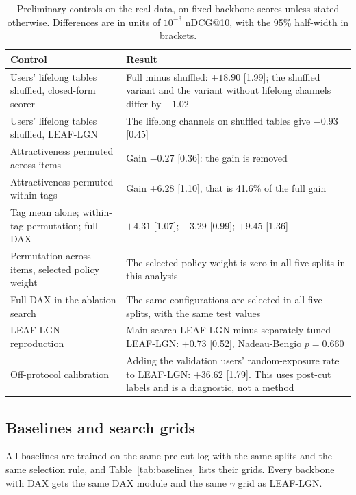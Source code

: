 \begin{table}[tbp]
\centering
\caption{Preliminary controls on the real data, on fixed backbone scores unless stated otherwise. Differences are in units of $10^{-3}$ nDCG@10, with the 95\% half-width in brackets.}
\label{tab:controls-real}
\footnotesize
\renewcommand{\arraystretch}{1.1}
\begin{tabular}{p{}p{}}
\toprule
Control & Result \\
\midrule
Users' lifelong tables shuffled, closed-form scorer & Full minus shuffled: $+18.90$ [1.99]; the shuffled variant and the variant without lifelong channels differ by $-1.02$ \\
Users' lifelong tables shuffled, LEAF-LGN & The lifelong channels on shuffled tables give $-0.93$ [0.45] \\
Attractiveness permuted across items & Gain $-0.27$ [0.36]: the gain is removed \\
Attractiveness permuted within tags & Gain $+6.28$ [1.10], that is 41.6\% of the full gain \\
Tag mean alone; within-tag permutation; full DAX & $+4.31$ [1.07]; $+3.29$ [0.99]; $+9.45$ [1.36] \\
Permutation across items, selected policy weight & The selected policy weight is zero in all five splits in this analysis \\
Full DAX in the ablation search & The same configurations are selected in all five splits, with the same test values \\
LEAF-LGN reproduction & Main-search LEAF-LGN minus separately tuned LEAF-LGN: $+0.73$ [0.52], Nadeau-Bengio $p=0.660$ \\
Off-protocol calibration & Adding the validation users' random-exposure rate to LEAF-LGN: $+36.62$ [1.79]. This uses post-cut labels and is a diagnostic, not a method \\
\bottomrule
\end{tabular}
\end{table}

\subsection{Baselines and search grids}\label{app:baselines}

All baselines are trained on the same pre-cut log with the same splits and the same selection rule, and Table~\ref{tab:baselines} lists their grids. Every backbone with DAX gets the same DAX module and the
same $\gamma$ grid as LEAF-LGN.

